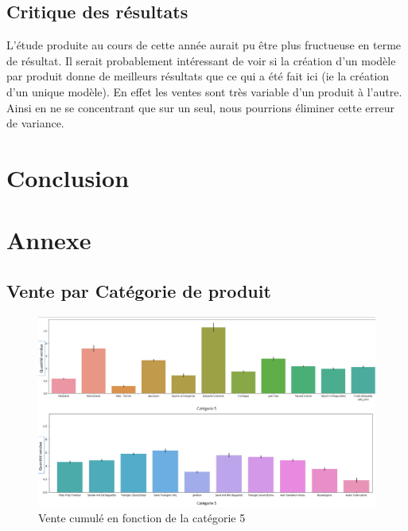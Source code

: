 \documentclass{article} %
\begin{document}
\subsection{Critique des résultats}
L'étude produite au cours de cette année aurait pu être plus fructueuse en terme de résultat. Il serait probablement intéressant de voir si la création d'un modèle par produit donne de meilleurs résultats que ce qui a été fait ici (ie la création d'un unique modèle). En effet les ventes sont très variable d'un produit à l'autre. Ainsi en ne se concentrant que sur un seul, nous pourrions éliminer cette erreur de variance.

\section{Conclusion}

\newpage
\section{Annexe}
\subsection{Vente par Catégorie de produit}
\label{sec:catprod}
\begin{figure}[!h]
	\centering
	\includegraphics[keepaspectratio = true,scale=0.65]{categorie.png}
	\caption{Vente cumulé en fonction de la catégorie 5}
\end{figure}
\end{document}
